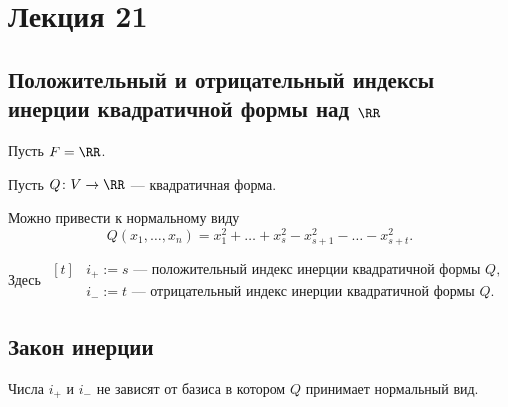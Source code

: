 \section{Лекция 21}

\subsection{Положительный и отрицательный индексы инерции квадратичной формы над $\RR$}

Пусть $F = \RR$.

Пусть $Q \colon V \to \RR$ --- квадратичная форма.

Можно привести к нормальному виду
\begin{equation*}
    Q(x_1, \dots, x_n) = x_1^2 + \dots + x_s^2 - x_{s + 1}^2 - \dots - x_{s + t}^2
.\end{equation*}

Здесь
\begin{math}
    \begin{aligned}[t]
        &i_+ := s \text{ --- положительный индекс инерции квадратичной формы $Q$}, \\
        &i_- := t \text{ --- отрицательный индекс инерции квадратичной формы $Q$}.
    \end{aligned}
\end{math}


\subsection{Закон инерции}

\begin{theorem}
    Числа $i_+$ и $i_-$ не зависят от базиса в котором $Q$ принимает нормальный вид.
\end{theorem}

